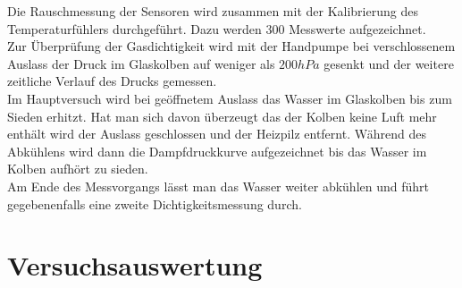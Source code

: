 \documentclass[12pt,a4paper]{article}
\begin{document}
Die Rauschmessung der Sensoren wird zusammen mit der Kalibrierung des Temperaturfühlers durchgeführt. Dazu werden $300$ Messwerte aufgezeichnet.\\
Zur Überprüfung der Gasdichtigkeit wird mit der Handpumpe bei verschlossenem Auslass der Druck im Glaskolben auf weniger als $200hPa$ gesenkt und der weitere zeitliche Verlauf des Drucks gemessen.\\

Im Hauptversuch wird bei geöffnetem Auslass das Wasser im Glaskolben bis zum Sieden erhitzt. Hat man sich davon überzeugt das der Kolben keine Luft mehr enthält wird der Auslass geschlossen und der Heizpilz entfernt. Während des Abkühlens wird dann die Dampfdruckkurve aufgezeichnet bis das Wasser im Kolben aufhört zu sieden.\\
Am Ende des Messvorgangs lässt man das Wasser weiter abkühlen und führt gegebenenfalls eine zweite Dichtigkeitsmessung durch. 

\section{Versuchsauswertung}
\end{document}
